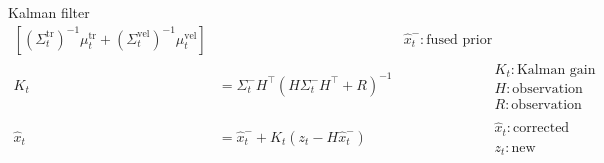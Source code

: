\begin{frame}[allowframebreaks]{Kalman filter}
\[\begin{aligned}
            \left[
                (\Sigma^{\mathrm{tr}}_{t})^{-1}\mu^{\mathrm{tr}}_{t}
                +
                (\Sigma^{\mathrm{vel}}_{t})^{-1}\mu^{\mathrm{vel}}_{t}
            \right]
            &&
            \hat{x}^{-}_{t}: \text{fused prior estimate}
            \\[8pt]
            K_{t}
            &=
            \Sigma^{-}_{t}H^{\top}
            \left(
                H\Sigma^{-}_{t}H^{\top}
                +
                R
            \right)^{-1}
            &&
            \begin{array}{l}
                K_{t}: \text{Kalman gain} \\
                H: \text{observation matrix} \\
                R: \text{observation noise covariance}
            \end{array}
            \\[8pt]
            \hat{x}_{t}
            &=
            \hat{x}^{-}_{t}
            +
            K_{t}
            \left(
                z_{t}
                -
                H\hat{x}^{-}_{t}
            \right)
            &&
            \begin{array}{l}
                \hat{x}_{t}: \text{corrected estimate} \\
                z_{t}: \text{new observation}
            \end{array}
        \end{aligned}
    \]
\end{frame}